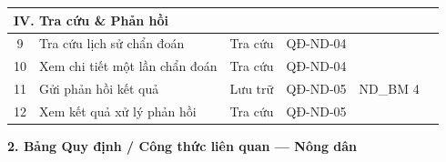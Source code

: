 \documentclass[12pt,a4paper]{article}
\begin{document}
\begin{longtable}{|c|l|l|l|l|p{3.5cm}|}
    \hline
    \multicolumn{6}{|l|}{\cellcolor{notegreen}\textbf{IV. Tra cứu \& Phản hồi}}                                                                                         \\
    \hline
    9            & Tra cứu lịch sử chẩn đoán        & Tra cứu                 & QĐ-ND-04                       &                             &                          \\
    \hline
    10           & Xem chi tiết một lần chẩn đoán   & Tra cứu                 & QĐ-ND-04                       &                             &                          \\
    \hline
    11           & Gửi phản hồi kết quả             & Lưu trữ                 & QĐ-ND-05                       & ND\_BM 4                    &                          \\
    \hline
    12           & Xem kết quả xử lý phản hồi       & Tra cứu                 & QĐ-ND-05                       &                             &                          \\
    \hline
\end{longtable}

\vspace{0.3cm}
\textbf{2. Bảng Quy định / Công thức liên quan --- Nông dân}
\end{document}
